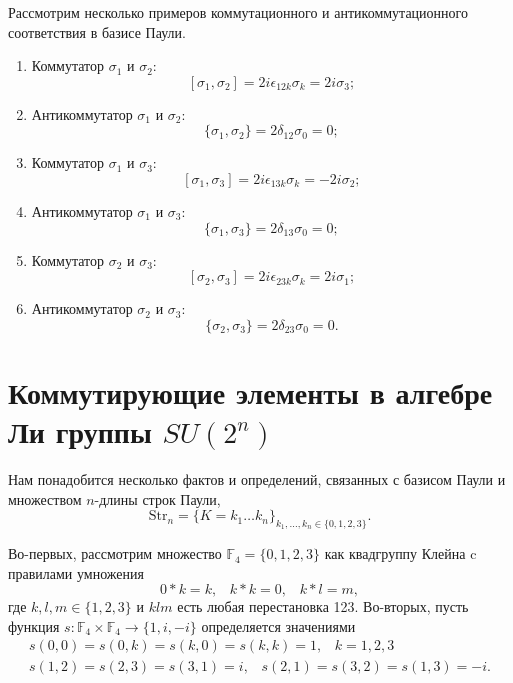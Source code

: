 \documentclass[a4paper]{report}
\begin{document}
Рассмотрим несколько примеров коммутационного и антикоммутационного соответствия в базисе Паули.

\begin{enumerate}
    \item Коммутатор ${\sigma_1}$ и ${\sigma_2}$:
          $${[\sigma_1,\sigma_2] = 2i\epsilon_{12k}\sigma_k = 2i\sigma_3};$$
    \item Антикоммутатор ${\sigma_1}$ и ${\sigma_2}$:
          $${\{\sigma_1,\sigma_2\} = 2\delta_{12}\sigma_0 = 0};$$
    \item Коммутатор ${\sigma_1}$ и ${\sigma_3}$:
          $${[\sigma_1,\sigma_3] = 2i\epsilon_{13k}\sigma_k = -2i\sigma_2};$$
    \item Антикоммутатор ${\sigma_1}$ и ${\sigma_3}$:
          $${\{\sigma_1,\sigma_3\} = 2\delta_{13}\sigma_0 = 0};$$
    \item Коммутатор ${\sigma_2}$ и ${\sigma_3}$:
          $${[\sigma_2,\sigma_3] = 2i\epsilon_{23k}\sigma_k = 2i\sigma_1};$$
    \item Антикоммутатор ${\sigma_2}$ и ${\sigma_3}$:
          $${\{\sigma_2,\sigma_3\} = 2\delta_{23}\sigma_0 = 0}.$$
\end{enumerate}

\newpage


\section{Коммутирующие элементы в алгебре Ли группы ${SU(2^{n})}$}

Нам понадобится несколько фактов и определений, связанных с базисом Паули и множеством  ${n}$-длины строк Паули,
$${
    \mathrm{Str}_n = \{K=k_1\ldots k_n\}_{k_1,\ldots,k_n\in\{0,1,2,3\} }.
    }$$

Во-первых, рассмотрим множество ${ \mathbb{F}_4=\{0,1,2,3\} }$ как квадгруппу ${\mbox{Клейна}}$ c правилами умножения
$${
            0*k = k,\;\;\; k*k=0, \;\;\; k*l=m,
        }$$
где ${k,l,m\in\{1,2,3\}}$ и ${klm}$ есть любая перестановка 123. Во-вторых, пусть функция ${s:\mathbb{F}_4\times\mathbb{F}_4}\rightarrow\{1,i,-i\}$ определяется значениями
$${
            \begin{array}{l}
                s(0,0)=s(0,k)=s(k,0)=s(k,k)=1,\;\;\;k=1,2,3           \\
                s(1,2)=s(2,3)=s(3,1)=i,\;\;\;s(2,1)=s(3,2)=s(1,3)=-i.
            \end{array}
        }$$
\end{document}

